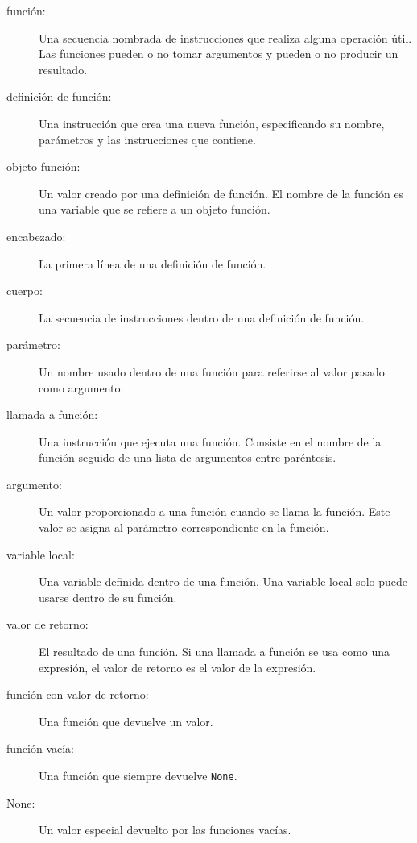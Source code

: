 \documentclass[12pt,letterpaper]{book}
\begin{document}
\begin{description}
\item[función:] Una secuencia nombrada de instrucciones que realiza alguna operación útil. Las funciones pueden o no tomar argumentos y pueden o no producir un resultado.

\item[definición de función:] Una instrucción que crea una nueva función, especificando su nombre, parámetros y las instrucciones que contiene.

\item[objeto función:] Un valor creado por una definición de función. El nombre de la función es una variable que se refiere a un objeto función.

\item[encabezado:] La primera línea de una definición de función.

\item[cuerpo:] La secuencia de instrucciones dentro de una definición de función.

\item[parámetro:] Un nombre usado dentro de una función para referirse al valor pasado como argumento.

\item[llamada a función:] Una instrucción que ejecuta una función. Consiste en el nombre de la función seguido de una lista de argumentos entre paréntesis.

\item[argumento:] Un valor proporcionado a una función cuando se llama la función. Este valor se asigna al parámetro correspondiente en la función.

\item[variable local:] Una variable definida dentro de una función. Una variable local solo puede usarse dentro de su función.

\item[valor de retorno:] El resultado de una función. Si una llamada a función se usa como una expresión, el valor de retorno es el valor de la expresión.

\item[función con valor de retorno:] Una función que devuelve un valor.

\item[función vacía:] Una función que siempre devuelve \texttt{None}.

\item[None:] Un valor especial devuelto por las funciones vacías.


\end{description}
\end{document}
